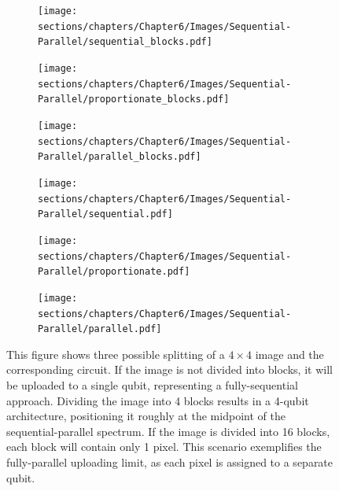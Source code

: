 \begin{figure}
    \centering
    \begin{subfigure}[b]{0.3\textwidth}
        \centering
        \texttt{[image: sections/chapters/Chapter6/Images/Sequential-Parallel/sequential\_blocks.pdf]}
        \label{fig:sequential-block}
    \end{subfigure}
    \hfill
    \begin{subfigure}[b]{0.3\textwidth}
        \centering
        \texttt{[image: sections/chapters/Chapter6/Images/Sequential-Parallel/proportionate\_blocks.pdf]}
        \label{fig:prop-block}
    \end{subfigure}
    \hfill
    \begin{subfigure}[b]{0.3\textwidth}
        \centering
        \texttt{[image: sections/chapters/Chapter6/Images/Sequential-Parallel/parallel\_blocks.pdf]}
        \label{fig:parallel-block}
    \end{subfigure}
    \hfill
    \begin{subfigure}[b]{0.3\textwidth}
        \centering
        \texttt{[image: sections/chapters/Chapter6/Images/Sequential-Parallel/sequential.pdf]}
        \label{fig:sequential-circ}
    \end{subfigure}
    \hfill
    \begin{subfigure}[b]{0.3\textwidth}
        \centering
        \texttt{[image: sections/chapters/Chapter6/Images/Sequential-Parallel/proportionate.pdf]}
        \label{fig:prop-circ}
    \end{subfigure}
    \hfill
    \begin{subfigure}[b]{0.3\textwidth}
        \centering
        \texttt{[image: sections/chapters/Chapter6/Images/Sequential-Parallel/parallel.pdf]}
        \label{fig:parallel-circ}
    \end{subfigure}
    \caption{This figure shows three possible splitting of a $4\times4$ image and the corresponding 
    circuit. 
    If the image is not divided into blocks, it will be uploaded to a single qubit, 
    representing a fully-sequential approach. 
    Dividing the image into 4 blocks results in a 4-qubit architecture, 
    positioning it roughly at the midpoint of the sequential-parallel spectrum.
    If the image is divided into 16 blocks, each block will contain only 1 pixel. 
    This scenario exemplifies the fully-parallel uploading limit, as each pixel is assigned to 
    a separate qubit.}
    \label{fig:three-splitting}
\end{figure}



